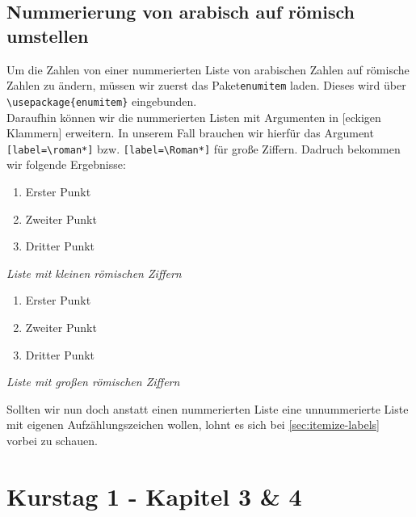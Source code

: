 \documentclass[
12pt,
ngerman
]{scrreprt}
\begin{document}
\section{Nummerierung von arabisch auf römisch umstellen}
\label{sec:enum-label}
Um die Zahlen von einer nummerierten Liste von arabischen Zahlen auf römische Zahlen zu ändern, müssen wir zuerst das Paket\verb!enumitem! laden. Dieses wird über \verb!\usepackage{enumitem}! eingebunden. \\
Daraufhin können wir die nummerierten Listen mit Argumenten in [eckigen Klammern] erweitern. In unserem Fall brauchen wir hierfür das Argument \verb![label=\roman*]! bzw. \verb![label=\Roman*]! für große Ziffern. Dadruch bekommen wir folgende Ergebnisse:
\begin{multicols}{2}
  \begin{enumerate}[label=\roman*]
    \item Erster Punkt
    \item Zweiter Punkt
    \item Dritter Punkt
  \end{enumerate}
  \emph{Liste mit kleinen römischen Ziffern}
  \begin{enumerate}[label=\Roman*]
    \item Erster Punkt
    \item Zweiter Punkt
    \item Dritter Punkt
  \end{enumerate}
  \emph{Liste mit großen römischen Ziffern}
\end{multicols}
Sollten wir nun doch anstatt einen nummerierten Liste eine unnummerierte Liste mit eigenen Aufzählungszeichen wollen, lohnt es sich bei \cref{sec:itemize-labels} vorbei zu schauen.

\chapter{Kurstag 1 - Kapitel 3 \& 4}
\label{cha:chap3-4}
\label{blatt:2}
\end{document}
